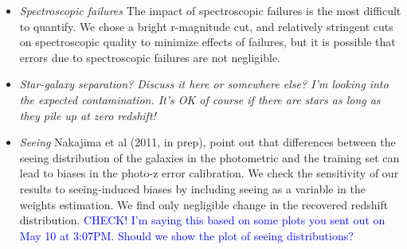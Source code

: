 \documentclass{emulateapj}
\begin{document}
\begin{itemize}
\item {\it Spectroscopic failures} The impact of spectroscopic failures is the
most difficult to quantify.  We chose a bright r-magnitude cut, and relatively
stringent cuts on spectroscopic quality to minimize effects of failures, but it
is possible that errors due to spectroscopic failures are not negligible.

\item {\it Star-galaxy separation? Discuss it here or somewhere else? {\color{red} I'm
looking into the expected contamination.  It's OK of course if there are stars as long as they
pile up at zero redshift!}}

\item {\it Seeing} Nakajima et al (2011, in prep), point out that differences between the seeing distribution of 
the galaxies in the photometric and the training set can lead to biases in the photo-z error calibration.
We check the sensitivity of our results to seeing-induced biases by including seeing as a variable in the weights
estimation.
We find only negligible change in the recovered redshift distribution. \textcolor{blue}{CHECK! I'm saying this based on some plots you sent out on May 10 at 3:07PM}.
\textcolor{blue}{Should we show the plot of seeing distributions?}

\end{itemize}
\end{document}
